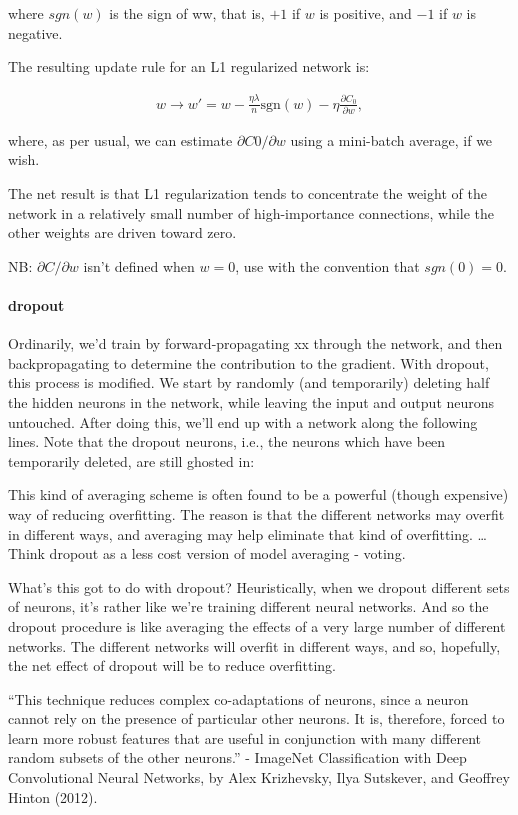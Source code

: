 \documentclass[]{book}
\let\oldparagraph\paragraph
\renewcommand{\paragraph}[1]{\oldparagraph{#1}\mbox{}}
\begin{document}
where \(sgn(w)\) is the sign of ww, that is, \(+1\) if \(w\) is
positive, and \(-1\) if \(w\) is negative.

The resulting update rule for an L1 regularized network is:

\begin{eqnarray}  
w \rightarrow w' = w - \frac{\eta \lambda}{n} \mbox{sgn}(w) - \eta \frac{\partial C_0}{\partial w},
\tag{97}\end{eqnarray}

where, as per usual, we can estimate \(∂C0/∂w\) using a mini-batch
average, if we wish.

The net result is that L1 regularization tends to concentrate the weight
of the network in a relatively small number of high-importance
connections, while the other weights are driven toward zero.

NB: \(∂C/∂w\) isn't defined when \(w=0\), use with the convention that
\(sgn(0)=0\).

\paragraph{dropout}\label{dropout}

Ordinarily, we'd train by forward-propagating xx through the network,
and then backpropagating to determine the contribution to the gradient.
With dropout, this process is modified. We start by randomly (and
temporarily) deleting half the hidden neurons in the network, while
leaving the input and output neurons untouched. After doing this, we'll
end up with a network along the following lines. Note that the dropout
neurons, i.e., the neurons which have been temporarily deleted, are
still ghosted in:

This kind of averaging scheme is often found to be a powerful (though
expensive) way of reducing overfitting. The reason is that the different
networks may overfit in different ways, and averaging may help eliminate
that kind of overfitting. \ldots{} Think dropout as a less cost version
of model averaging - voting.

What's this got to do with dropout? Heuristically, when we dropout
different sets of neurons, it's rather like we're training different
neural networks. And so the dropout procedure is like averaging the
effects of a very large number of different networks. The different
networks will overfit in different ways, and so, hopefully, the net
effect of dropout will be to reduce overfitting.

``This technique reduces complex co-adaptations of neurons, since a
neuron cannot rely on the presence of particular other neurons. It is,
therefore, forced to learn more robust features that are useful in
conjunction with many different random subsets of the other neurons.'' -
ImageNet Classification with Deep Convolutional Neural Networks, by Alex
Krizhevsky, Ilya Sutskever, and Geoffrey Hinton (2012).
\end{document}
